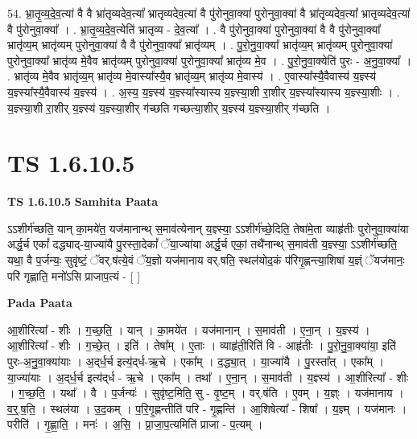 \documentclass[17pt]{extarticle}
\begin{document}
54. भ्रा॒तृ॒व्य॒दे॒व॒त्या॑ वै वै भ्रा॑तृव्यदेव॒त्या᳚ भ्रातृव्यदेव॒त्या॑ वै पु॑रोनुवा॒क्या॑ पुरोनुवा॒क्या॑ वै भ्रा॑तृव्यदेव॒त्या᳚ भ्रातृव्यदेव॒त्या॑ वै पु॑रोनुवा॒क्या᳚ । . भ्रा॒तृ॒व्य॒दे॒व॒त्येति॑ भ्रातृव्य - दे॒व॒त्या᳚ । . वै पु॑रोनुवा॒क्या॑ पुरोनुवा॒क्या॑ वै वै पु॑रोनुवा॒क्या᳚ भ्रातृ॑व्य॒म् भ्रातृ॑व्यम् पुरोनुवा॒क्या॑ वै वै पु॑रोनुवा॒क्या᳚ भ्रातृ॑व्यम् । . पु॒रो॒नु॒वा॒क्या᳚ भ्रातृ॑व्य॒म् भ्रातृ॑व्यम् पुरोनुवा॒क्या॑ पुरोनुवा॒क्या᳚ भ्रातृ॑व्य मे॒वैव भ्रातृ॑व्यम् पुरोनुवा॒क्या॑ पुरोनुवा॒क्या᳚ भ्रातृ॑व्य मे॒व । . पु॒रो॒नु॒वा॒क्येति॑ पुरः - अ॒नु॒वा॒क्या᳚ । . भ्रातृ॑व्य मे॒वैव भ्रातृ॑व्य॒म् भ्रातृ॑व्य मे॒वास्या᳚स्यै॒व भ्रातृ॑व्य॒म् भ्रातृ॑व्य मे॒वास्य॑ । . ए॒वास्या᳚स्यै॒वैवास्य॑ य॒ज्ञ्स्य॑ य॒ज्ञ्स्या᳚स्यै॒वैवास्य॑ य॒ज्ञ्स्य॑ । . अ॒स्य॒ य॒ज्ञ्स्य॑ य॒ज्ञ्स्या᳚स्यास्य य॒ज्ञ्स्या॒शी रा॒शीर् य॒ज्ञ्स्या᳚स्यास्य य॒ज्ञ्स्या॒शीः । . य॒ज्ञ्स्या॒शी रा॒शीर् य॒ज्ञ्स्य॑ य॒ज्ञ्स्या॒शीर् ग॑च्छति गच्छत्या॒शीर् य॒ज्ञ्स्य॑ य॒ज्ञ्स्या॒शीर् ग॑च्छति । \newline
\pagebreak
{}
\section*{ TS 1.6.10.5 }

\textbf{TS 1.6.10.5 } \newline
\textbf{Samhita Paata} \newline

ऽऽशीर्ग॑च्छति॒ यान् का॒मये॑त॒ यज॑मानान्थ् स॒माव॑त्येनान् य॒ज्ञ्स्या॒ ऽऽशीर्ग॑च्छे॒दिति॒ तेषा॑मे॒ता व्याहृ॑तीः पुरोनुवा॒क्या॑या अर्द्ध॒र्च एकां᳚ दद्ध्याद्-या॒ज्या॑यै पु॒रस्ता॒देकां᳚ ॅया॒ज्या॑या अर्द्ध॒र्च एकां॒ तथै॑नान्थ् स॒माव॑ती य॒ज्ञ्स्या॒ ऽऽशीर्ग॑च्छति॒ यथा॒ वै प॒र्जन्यः॒ सुवृ॑ष्टं॒ ॅवर्.ष॑त्ये॒वं ॅय॒ज्ञो यज॑मानाय वर्.षति॒ स्थल॑योद॒कं प॑रिगृ॒ह्णन्त्या॒शिषा॑ य॒ज्ञ्ं ॅयज॑मानः॒ परि॑ गृह्णाति॒ मनो॑ऽसि प्राजाप॒त्यं - [ ] \newline

\textbf{Pada Paata} \newline

आ॒शीरित्या᳚ - शीः । ग॒च्छ॒ति॒ । यान् । का॒मये॑त । यज॑मानान् । स॒माव॑ती । ए॒ना॒न् । य॒ज्ञ्स्य॑ । आ॒शीरित्या᳚ - शीः । ग॒च्छे॒त् । इति॑ । तेषा᳚म् । ए॒ताः । व्याहृ॑ती॒रिति॑ वि - आहृ॑तीः । पु॒रो॒नु॒वा॒क्या॑या॒ इति॑ पुरः-अ॒नु॒वा॒क्या॑याः । अ॒द्‌र्ध॒र्च इत्य॒॑द्‌र्ध-ऋ॒चे । एका᳚म् । द॒द्ध्या॒त् । या॒ज्या॑यै । पु॒रस्ता᳚त् । एका᳚म् । या॒ज्या॑याः । अ॒द्‌र्ध॒र्च इत्य॑द्‌र्ध - ऋ॒चे । एका᳚म् । तथा᳚ । ए॒ना॒न् । स॒माव॑ती । य॒ज्ञ्स्य॑ । आ॒शीरित्या᳚ - शीः । ग॒च्छ॒ति॒ । यथा᳚ । वै । प॒र्जन्यः॑ । सुवृ॑ष्ट॒मिति॒ सु - वृ॒ष्ट॒म् । वर्.ष॑ति । ए॒वम् । य॒ज्ञ्ः । यज॑मानाय । व॒र्॒.ष॒ति॒ । स्थल॑या । उ॒द॒कम् । प॒रि॒गृ॒ह्णन्तीति॑ परि - गृ॒ह्णन्ति॑ । आ॒शिषेत्या᳚ - शिषा᳚ । य॒ज्ञ्म् । यज॑मानः । परीति॑ । गृ॒ह्णा॒ति॒ । मनः॑ । अ॒सि॒ । प्रा॒जा॒प॒त्यमिति॑ प्राजा - प॒त्यम् ।  \newline
\end{document}
